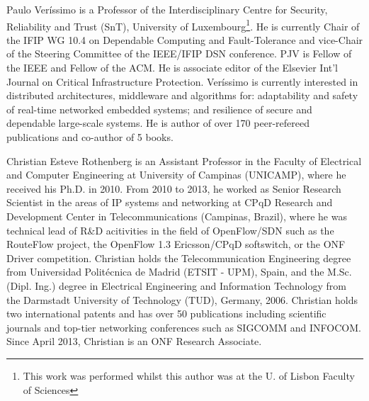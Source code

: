 \documentclass[journal]{IEEEtran}
\begin{document}

\begin{IEEEbiographynophoto}{Paulo Ver\'{i}ssimo}
is a Professor of the 	Interdisciplinary Centre for Security, Reliability and Trust (SnT), University of Luxembourg\footnote{This work was performed whilst this author was at the U. of Lisbon Faculty of Sciences}. He is currently Chair of the IFIP WG 10.4 on Dependable Computing and Fault-Tolerance and vice-Chair of the Steering Committee of the IEEE/IFIP DSN conference. PJV is Fellow of the IEEE and Fellow of the ACM. He is associate editor of the Elsevier Int'l Journal on Critical Infrastructure Protection. Ver\'{i}ssimo is currently interested in distributed architectures, middleware and algorithms for: adaptability and safety of real-time networked embedded systems; and resilience of secure and dependable large-scale systems. He is author of over 170 peer-refereed publications and co-author of 5 books. 
\end{IEEEbiographynophoto}

\begin{IEEEbiographynophoto}{Christian Esteve Rothenberg} is an Assistant Professor in the Faculty of Electrical and Computer Engineering at University of Campinas (UNICAMP), where he received his Ph.D. in 2010. 
From 2010 to 2013, he worked as Senior Research Scientist in the areas of IP systems and networking at CPqD Research and Development Center in Telecommunications (Campinas, Brazil), where he was technical lead of R\&D acitivities in the field of OpenFlow/SDN such as the RouteFlow project, the OpenFlow 1.3 Ericsson/CPqD softswitch, or the ONF Driver competition. 
Christian holds the Telecommunication Engineering degree from Universidad Polit\'{e}cnica de Madrid (ETSIT - UPM), Spain, and the M.Sc. (Dipl. Ing.) degree in Electrical Engineering and Information Technology from the Darmstadt University of Technology (TUD), Germany, 2006. Christian holds two international patents and has over 50 publications including scientific journals and top-tier networking conferences such as SIGCOMM and INFOCOM. Since April 2013, Christian is an ONF Research Associate.
\end{IEEEbiographynophoto}
\end{document}
